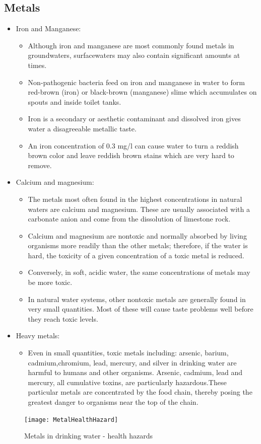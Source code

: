 \subsection{Metals}
\begin{itemize}
\item Iron and Manganese:\\
\begin{itemize}
\item Although iron and manganese are most commonly found metals in groundwaters, surfacewaters may also contain significant amounts at times. 
\item Non-pathogenic bacteria feed on iron and manganese in water to form red-brown (iron) or black-brown (manganese) slime which accumulates on spouts and inside toilet tanks.
\item Iron is a secondary or aesthetic contaminant and dissolved iron gives water a disagreeable metallic taste.
\item An iron concentration of 0.3 mg/l can cause water to turn a reddish brown color and leave reddish brown stains which are very hard to remove.
\end{itemize}
\item Calcium and magnesium:  \\
\begin{itemize}
\item The metals most often found in the highest concentrations in natural waters are calcium and magnesium. These are usually associated with a carbonate anion and come from the dissolution of limestone rock.
\item Calcium and magnesium are nontoxic and normally absorbed by living organisms more readily than the other metals; therefore, if the water is hard, the toxicity of a given concentration of a toxic metal is reduced. 
\item Conversely, in soft, acidic water, the same concentrations of metals may be more toxic. 
\item In natural water systems, other nontoxic metals are generally found in very small quantities. Most of these will cause taste problems well before they reach toxic levels.
\end{itemize}
\item Heavy metals:\\
\begin{itemize}
\item Even in small quantities, toxic metals including: arsenic, barium, cadmium,chromium, lead, mercury, and silver in drinking water are harmful to humans and other organisms. Arsenic, cadmium, lead and mercury, all cumulative toxins, are particularly hazardous.These particular metals are concentrated by the food chain, thereby posing the greatest danger to organisms near the top of the chain.
\end{itemize}
\end{itemize}
\begin{figure}[]
\begin{center}
\texttt{[image: MetalHealthHazard]}
\caption{Metals in drinking water - health hazards}
\end{center}
\end{figure}
